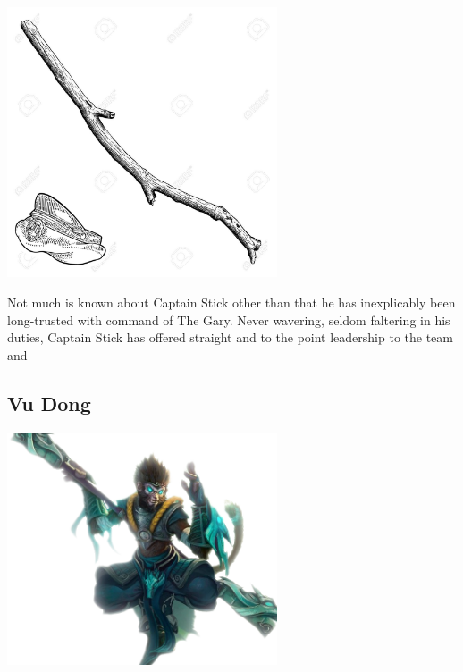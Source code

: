 \begin{center}
\includegraphics[width=80mm]{./content/img/captainStick.jpg}
\begin{figure}[h]
\end{figure}
\end{center}

\noindent 

Not much is known about Captain Stick other than that he has inexplicably been long-trusted with command of The Gary.  Never wavering, seldom faltering in his duties, Captain Stick has offered straight and to the point leadership to the team  and    

\smallskip

\subsection*{Vu Dong} 

\begin{center}
\includegraphics[width=80mm]{./content/img/vu.png}
\begin{figure}[h]
\end{figure}
\end{center}

